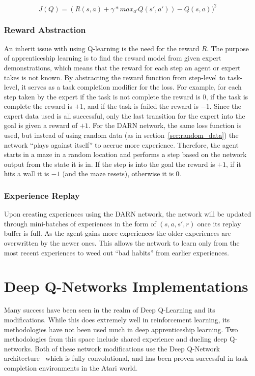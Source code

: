 \documentclass[12pt,american]{report}
\begin{document}
\begin{equation}
     \label{eq:dal-dqn-loss}
     J(Q) =(R(s,a)+\gamma*max_{a'}Q(s',a'))-Q(s,a))^2
\end{equation}
\subsubsection{Reward Abstraction}
An inherit issue with using Q-learning is the need for the reward $R$.  The purpose of apprenticeship learning is to find the reward model from given expert demonstrations, which means that the reward for each step an agent or expert takes is not known. By abstracting the reward function from step-level to task-level, it serves as a task completion modifier for the loss.  For example, for each step taken by the expert if the task is not complete the reward is $0$, if the task is complete the reward is $+1$, and if the task is failed the reward is $-1$.  Since the expert data used is all successful, only the last transition for the expert into the goal is given a reward of $+1$.  For the DARN network, the same loss function is used, but instead of using random data (as in section~\ref{sec:random_data}) the network ``plays against itself'' to accrue more experience.  Therefore, the agent starts in a maze in a random location and performs a step based on the network output from the state it is in.  If the step is into the goal the reward is $+1$, if it hits a wall it is $-1$ (and the maze resets), otherwise it is $0$.  

\subsubsection{Experience Replay}
Upon creating experiences using the DARN network, the network will be updated through mini-batches of experiences in the form of $(s,a,s',r)$ once its replay buffer is full.  As the agent gains more experiences the older experiences are overwritten by the newer ones.  This allows the network to learn only from the most recent experiences to weed out ``bad habits'' from earlier experiences. 

\section{Deep Q-Networks Implementations}
Many success have been seen in the realm of Deep Q-Learning and its modifications.  While this does extremely well in reinforcement learning, its methodologies have not been used much in deep apprenticeship learning.  Two methodologies from this space include shared experience and dueling deep Q-networks.  Both of these network modifications use the Deep Q-Network architecture~\cite{atari} which is fully convolutional, and has been proven successful in task completion environments in the Atari world.
\end{document}
